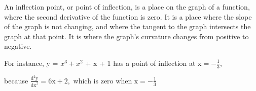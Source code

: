 An inflection point, or point of inflection, is a place on the graph
of a function, where the second derivative of the function is zero.
It is a place where the slope of the graph is not changing, and where
the tangent to the graph intersects the graph at that point. It is
where the graph's curvature changes from positive to negative.
\par
For instance, y = $x^{3} + x^{2}$  + x + 1 has a
point of inflection at $ \mathrm{x} = - \frac{1}{3}, $

because $ \frac {\mathrm{d}^2 \mathrm{y}}{\mathrm{dx}^2} = 6 \mathrm{x} + 2, $ 
which is zero when $ \mathrm{x} = - \frac{1}{3} $